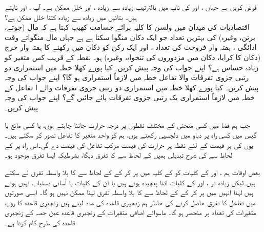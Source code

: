 فرض کریں  ہے جہاں ،  اور  کی ناپ میں بالترتیب زیادہ سے زیادہ ،  اور  خلل ممکن ہے۔ آپ ،  اور  ناپتے ہیں۔ بتائیں   میں  زیادہ سے زیادہ کتنا خلل ممکن ہے؟
\\
اقتصادیات کی میدان میں ولسن کا کلیہ برائے جسامت کھیپ  کہتا ہے کہ   مال   (جوتے، برتن، وغیرہ)  کی بہترین  تعداد     جو ایک دکان  منگوا  سکتا ہے   ہے  جہاں  مال منگواتے وقت ادائگی   ، ہفتہ وار فروخت کی تعداد  ،  اور ایک رکن  کو دکان میں رکھنے کا ہفتہ وار خرچ (دکان کا کرایا، دکان میں مزدوروں کی تنخواہ، وغیرہ)  ہو۔ نقطہ   کے قریب  کس متغیر کو زیادہ حساس ہے؟ اپنے جواب کی وجہ پیش کریں۔
کیا پورے  کھلا خطہ  میں استمراری دو رتبی جزوی تفرقات والا   تفاعل  خطہ  میں لازماً استمراری ہو گا؟ اپنے جواب کی وجہ پیش کریں۔
کیا پورے کھلا خطہ  میں استمراری دو رتبی جزوی تفرقات والے ا   تفاعل کے  خطہ  میں لازماً استمراری یک رتبی جزوی تفرقات پائے جائیں گے؟ اپنے جواب کی وجہ پیش کریں۔


جب ہم  فضا میں کسی   منحنی   کے مختلف نقطوں پر درجہ حرارت  جاننا چاہتے ہوں، یا   کسی مائع  یا گیس میں   کسی راہ پر دباو میں دلچسپی رکھتے ہوں،  ہم  کو واحد متغیر  کا تفاعل تصور کر سکتے ہیں۔ یوں  کی ہر قیمت کے لئے نقطہ  پر    حرارت کی قیمت  مرکب تفاعل  کی قیمت دے گی۔اس راہ پر  کے لحاظ سے  کی شرح تبدیلی  ہمیں  کے لحاظ سے   کا تفرق دیگا، بشرطیکہ ایسا تفرق موجود ہو۔

بعض اوقات ہم ،  اور  کے کلیات کو  کے کلیہ میں پر کر کے   کے لحاظ سے  کا  بلا واسطہ تفرق لے سکتے ہیں۔لیکن زیادہ  تر  ،  اور  کے کلیات اتنا پیچیدہ ہوتے ہیں یا ان کے کلیات با آسانی دستیاب نہیں ہوتے ہیں لہٰذا   انہیں  میں پر کر کے  کے لحاظ سے  کا بلا واسطہ  تفرق لینا ممکن  نہیں ہو گا۔ ایسی صورتوں میں تفاعل کا تفرق حاصل کرنے کی خاطر ہم زنجیری قاعدہ کی مدد لیتے ہیں۔زنجیری قاعدہ کا روپ متغیرات کی تعداد پر منحصر ہو گا۔ ماسوائے اضافی متغیرات کے زنجیری قاعدہ عین حصہ  کے زنجیری قاعدہ کی طرح کام کرتا ہے۔

